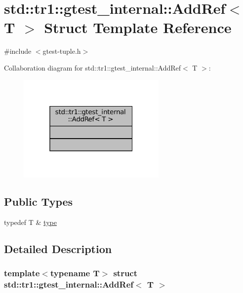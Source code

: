 \hypertarget{structstd_1_1tr1_1_1gtest__internal_1_1AddRef}{}\section{std\+:\+:tr1\+:\+:gtest\+\_\+internal\+:\+:Add\+Ref$<$ T $>$ Struct Template Reference}
\label{structstd_1_1tr1_1_1gtest__internal_1_1AddRef}


{\ttfamily \#include $<$gtest-\/tuple.\+h$>$}



Collaboration diagram for std\+:\+:tr1\+:\+:gtest\+\_\+internal\+:\+:Add\+Ref$<$ T $>$\+:
\nopagebreak
\begin{figure}[H]
\begin{center}
\leavevmode
\includegraphics[width=205pt]{structstd_1_1tr1_1_1gtest__internal_1_1AddRef__coll__graph}
\end{center}
\end{figure}
\subsection*{Public Types}
\begin{DoxyCompactItemize}
\item 
typedef T \& \hyperlink{structstd_1_1tr1_1_1gtest__internal_1_1AddRef_a1e5616e414125574c1653e3a1fc68491}{type}
\end{DoxyCompactItemize}


\subsection{Detailed Description}
\subsubsection*{template$<$typename T$>$\newline
struct std\+::tr1\+::gtest\+\_\+internal\+::\+Add\+Ref$<$ T $>$}



